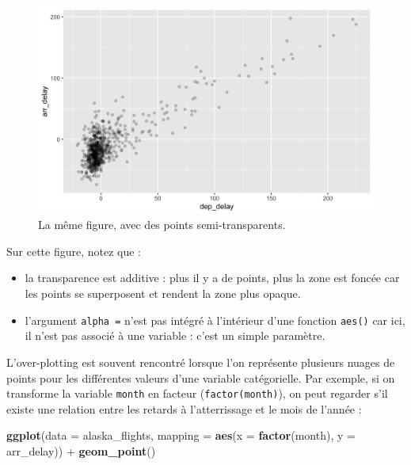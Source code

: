 \documentclass[a4paperpaper,]{article}
\newenvironment{Shaded}{\begin{snugshade}}{\end{snugshade}}
\newcommand{\DataTypeTok}[1]{\textcolor[rgb]{0.00,0.34,0.68}{#1}}
\newcommand{\KeywordTok}[1]{\textcolor[rgb]{0.12,0.11,0.11}{\textbf{#1}}}
\newcommand{\NormalTok}[1]{\textcolor[rgb]{0.12,0.11,0.11}{#1}}
\newcommand{\OperatorTok}[1]{\textcolor[rgb]{0.12,0.11,0.11}{#1}}
\newcommand{\StringTok}[1]{\textcolor[rgb]{0.75,0.01,0.01}{#1}}
\providecommand{\tightlist}{%
  \setlength{\itemsep}{0pt}\setlength{\parskip}{0pt}}
\begin{document}
\begin{figure}[htpb]

{\centering \includegraphics[width=0.9\linewidth]{figure/transparent-1} 

}

\caption{La même figure, avec des points semi-transparents.}\label{fig:transparent}
\end{figure}

Sur cette figure, notez que :

\begin{itemize}
\tightlist
\item
  la transparence est additive : plus il y a de points, plus la zone est foncée car les points se superposent et rendent la zone plus opaque.
\item
  l'argument \texttt{alpha\ =} n'est pas intégré à l'intérieur d'une fonction \texttt{aes()} car ici, il n'est pas associé à une variable : c'est un simple paramètre.
\end{itemize}

L'over-plotting est souvent rencontré lorsque l'on représente plusieurs nuages de points pour les différentes valeurs d'une variable catégorielle. Par exemple, si on transforme la variable \texttt{month} en facteur (\texttt{factor(month)}), on peut regarder s'il existe une relation entre les retards à l'atterrissage et le mois de l'année :

\begin{Shaded}
\begin{Highlighting}[]
\KeywordTok{ggplot}\NormalTok{(}\DataTypeTok{data =}\NormalTok{ alaska_flights, }
       \DataTypeTok{mapping =} \KeywordTok{aes}\NormalTok{(}\DataTypeTok{x =} \KeywordTok{factor}\NormalTok{(month), }\DataTypeTok{y =}\NormalTok{ arr_delay)) }\OperatorTok{+}
\StringTok{  }\KeywordTok{geom_point}\NormalTok{()}
\end{Highlighting}
\end{Shaded}
\end{document}
